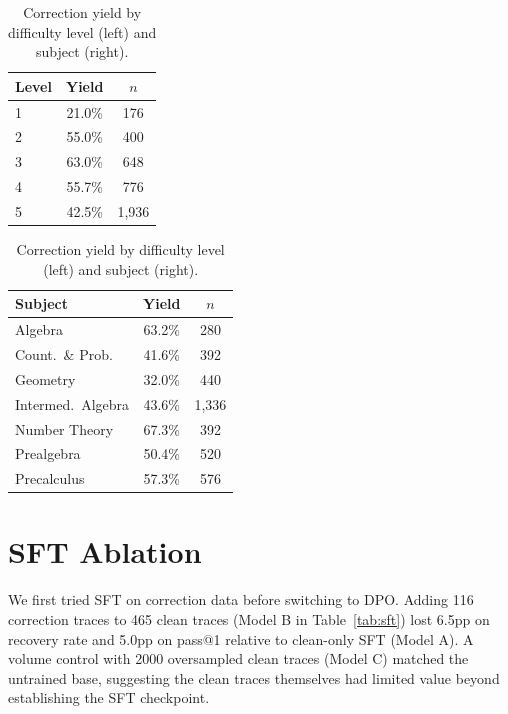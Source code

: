 \documentclass{article}
\begin{document}
\begin{table}[h]
    \centering
    \caption{Correction yield by difficulty level (left) and subject (right).}
    \vspace{0.5em}
    \begin{minipage}{0.45\textwidth}
        \centering
        \begin{tabular}{lcc}
            \toprule
            Level & Yield & $n$ \\
            \midrule
            1 & 21.0\% & 176 \\
            2 & 55.0\% & 400 \\
            3 & 63.0\% & 648 \\
            4 & 55.7\% & 776 \\
            5 & 42.5\% & 1,936 \\
            \bottomrule
        \end{tabular}
    \end{minipage}
    \hfill
    \begin{minipage}{0.50\textwidth}
        \centering
        \begin{tabular}{lcc}
            \toprule
            Subject & Yield & $n$ \\
            \midrule
            Algebra & 63.2\% & 280 \\
            Count.\ \& Prob.\ & 41.6\% & 392 \\
            Geometry & 32.0\% & 440 \\
            Intermed.\ Algebra & 43.6\% & 1,336 \\
            Number Theory & 67.3\% & 392 \\
            Prealgebra & 50.4\% & 520 \\
            Precalculus & 57.3\% & 576 \\
            \bottomrule
        \end{tabular}
    \end{minipage}
    \label{tab:level_subject}
\end{table}

\section{SFT Ablation}
\label{app:sft}

We first tried SFT on correction data before switching to DPO.
Adding 116 correction traces to 465 clean traces (Model B in Table~\ref{tab:sft}) lost 6.5pp on recovery rate and 5.0pp on pass@1 relative to clean-only SFT (Model A).
A volume control with 2000 oversampled clean traces (Model C) matched the untrained base, suggesting the clean traces themselves had limited value beyond establishing the SFT checkpoint.
\end{document}
